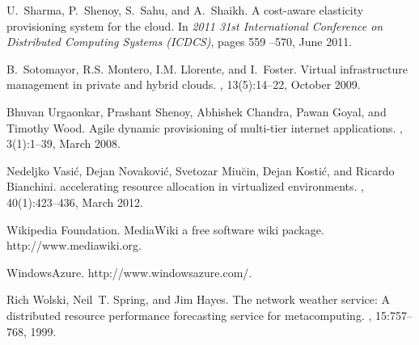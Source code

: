 \documentclass{sig-alternate-10pt}
\begin{document}
\begin{thebibliography}{10}
U.~Sharma, P.~Shenoy, S.~Sahu, and A.~Shaikh.
\newblock A cost-aware elasticity provisioning system for the cloud.
\newblock In {\em 2011 31st International Conference on Distributed Computing
  Systems ({ICDCS)}}, pages 559 --570, June 2011.

B.~Sotomayor, {R.S.} Montero, {I.M.} Llorente, and I.~Foster.
\newblock Virtual infrastructure management in private and hybrid clouds.
, 13(5):14--22, October 2009.

Bhuvan Urgaonkar, Prashant Shenoy, Abhishek Chandra, Pawan Goyal, and Timothy
  Wood.
\newblock Agile dynamic provisioning of multi-tier internet applications.
, 3(1):1--39, March 2008.

Nedeljko Vasi\'c, Dejan Novakovi\'c, Svetozar Miu\u cin, Dejan
  Kosti\'c, and Ricardo Bianchini.
 accelerating resource allocation in virtualized
  environments.
, 40(1):423--436, March 2012.

{Wikipedia Foundation}.
\newblock MediaWiki a free software wiki package. {http://www.mediawiki.org}.

{WindowsAzure. http://www.windowsazure.com/}.

Rich Wolski, Neil~T. Spring, and Jim Hayes.
\newblock The network weather service: A distributed resource performance
  forecasting service for metacomputing.
, 15:757--768,
  1999.

\end{thebibliography}
\end{document}
